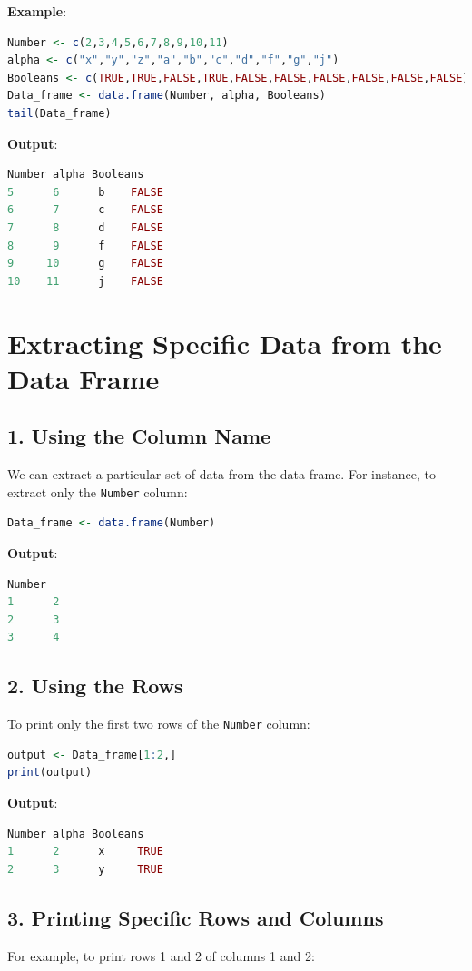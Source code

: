 \documentclass[10pt]{book}
\begin{document}
\textbf{Example}:
\begin{lstlisting}[language=R]
Number <- c(2,3,4,5,6,7,8,9,10,11)
alpha <- c("x","y","z","a","b","c","d","f","g","j")
Booleans <- c(TRUE,TRUE,FALSE,TRUE,FALSE,FALSE,FALSE,FALSE,FALSE,FALSE)
Data_frame <- data.frame(Number, alpha, Booleans)
tail(Data_frame)
\end{lstlisting}

\textbf{Output}:
\begin{lstlisting}[language=R]
Number alpha Booleans
5      6      b    FALSE
6      7      c    FALSE
7      8      d    FALSE
8      9      f    FALSE
9     10      g    FALSE
10    11      j    FALSE
\end{lstlisting}

\section{Extracting Specific Data from the Data Frame}
\subsection*{1. Using the Column Name}
We can extract a particular set of data from the data frame. For instance, to extract only the \texttt{Number} column:

\begin{lstlisting}[language=R]
Data_frame <- data.frame(Number)
\end{lstlisting}

\textbf{Output}:
\begin{lstlisting}[language=R]
Number
1      2
2      3
3      4
\end{lstlisting}

\subsection*{2. Using the Rows}
To print only the first two rows of the \texttt{Number} column:

\begin{lstlisting}[language=R]
output <- Data_frame[1:2,]
print(output)
\end{lstlisting}

\textbf{Output}:
\begin{lstlisting}[language=R]
Number alpha Booleans
1      2      x     TRUE
2      3      y     TRUE
\end{lstlisting}

\subsection*{3. Printing Specific Rows and Columns}
For example, to print rows 1 and 2 of columns 1 and 2:
\end{document}
